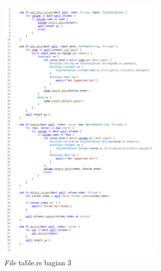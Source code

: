 \begin{figure}[H]
  \centering{}
	\includegraphics[width=0.7\textwidth]{gambar/lampiran/file-table-3.png}
  \caption{\emph{File} table.rs bagian 3}
\end{figure}

